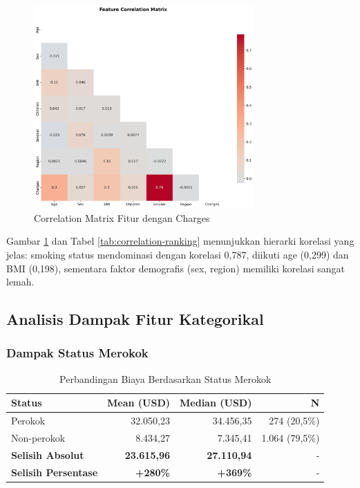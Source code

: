 \begin{figure}[H]
\centering
\includegraphics[width=0.75\textwidth]{../results/plots/04_correlation_matrix.png}
\caption{Correlation Matrix Fitur dengan Charges}
\label{fig:correlation-matrix}
\end{figure}

Gambar \ref{fig:correlation-matrix} dan Tabel \ref{tab:correlation-ranking} menunjukkan hierarki korelasi yang jelas: smoking status mendominasi dengan korelasi 0,787, diikuti age (0,299) dan BMI (0,198), sementara faktor demografis (sex, region) memiliki korelasi sangat lemah.

\subsection{Analisis Dampak Fitur Kategorikal}
\label{subsec:dampak-kategorikal}

\subsubsection{Dampak Status Merokok}

\begin{table}[H]
\centering
\caption{Perbandingan Biaya Berdasarkan Status Merokok}
\label{tab:smoking-impact}
\begin{tabular}{|l|r|r|r|}
\hline
\textbf{Status} & \textbf{Mean (USD)} & \textbf{Median (USD)} & \textbf{N} \\
\hline
Perokok & 32.050,23 & 34.456,35 & 274 (20,5\%) \\
Non-perokok & 8.434,27 & 7.345,41 & 1.064 (79,5\%) \\
\hline
\textbf{Selisih Absolut} & \textbf{23.615,96} & \textbf{27.110,94} & - \\
\textbf{Selisih Persentase} & \textbf{+280\%} & \textbf{+369\%} & - \\
\hline
\end{tabular}
\end{table}

